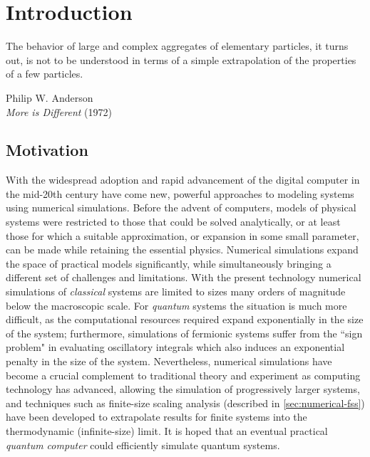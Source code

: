 \chapter{Introduction}

\setlength{}
{
  \SingleSpacing
  \epigraph{
    The behavior of large and complex aggregates of elementary particles, it
    turns out, is not to be understood in terms of a simple extrapolation of the
    properties of a few particles.
  }{Philip W. Anderson \\ \textit{More is Different} (1972)}
}


\section{Motivation}

With the widespread adoption and rapid advancement of the digital computer in
the mid-20th century have come new, powerful approaches to modeling systems
using numerical simulations. Before the advent of computers, models of physical
systems were restricted to those that could be solved analytically, or at least
those for which a suitable approximation, or expansion in some small parameter,
can be made while retaining the essential physics. Numerical simulations expand
the space of practical models significantly, while simultaneously bringing a
different set of challenges and limitations. With the present technology
numerical simulations of \emph{classical} systems are limited to sizes many
orders of magnitude below the macroscopic scale. For \emph{quantum} systems the
situation is much more difficult, as the computational resources required
expand exponentially in the size of the system; furthermore, simulations of
fermionic systems suffer from the ``sign problem" in evaluating oscillatory
integrals which also induces an exponential penalty in the size of the system.
Nevertheless, numerical simulations have become a crucial complement to
traditional theory and experiment as computing technology has advanced,
allowing the simulation of progressively larger systems, and techniques such as
finite-size scaling analysis (described in \cref{sec:numerical-fss}) have been
developed to extrapolate results for finite systems into the thermodynamic
(infinite-size) limit. It is hoped that an eventual practical \emph{quantum
  computer} could efficiently simulate quantum systems.

